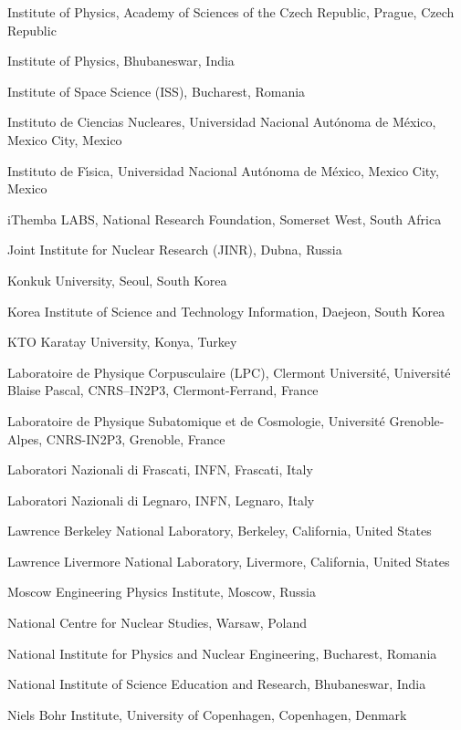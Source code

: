 \begin{flushleft}
\begin{Authlist}
\item {}Institute of Physics, Academy of Sciences of the Czech Republic, Prague, Czech Republic
\item {}Institute of Physics, Bhubaneswar, India
\item {}Institute of Space Science (ISS), Bucharest, Romania
\item {}Instituto de Ciencias Nucleares, Universidad Nacional Aut\'{o}noma de M\'{e}xico, Mexico City, Mexico
\item {}Instituto de F\'{\i}sica, Universidad Nacional Aut\'{o}noma de M\'{e}xico, Mexico City, Mexico
\item {}iThemba LABS, National Research Foundation, Somerset West, South Africa
\item {}Joint Institute for Nuclear Research (JINR), Dubna, Russia
\item {}Konkuk University, Seoul, South Korea
\item {}Korea Institute of Science and Technology Information, Daejeon, South Korea
\item {}KTO Karatay University, Konya, Turkey
\item {}Laboratoire de Physique Corpusculaire (LPC), Clermont Universit\'{e}, Universit\'{e} Blaise Pascal, CNRS--IN2P3, Clermont-Ferrand, France
\item {}Laboratoire de Physique Subatomique et de Cosmologie, Universit\'{e} Grenoble-Alpes, CNRS-IN2P3, Grenoble, France
\item {}Laboratori Nazionali di Frascati, INFN, Frascati, Italy
\item {}Laboratori Nazionali di Legnaro, INFN, Legnaro, Italy
\item {}Lawrence Berkeley National Laboratory, Berkeley, California, United States
\item {}Lawrence Livermore National Laboratory, Livermore, California, United States
\item {}Moscow Engineering Physics Institute, Moscow, Russia
\item {}National Centre for Nuclear Studies, Warsaw, Poland
\item {}National Institute for Physics and Nuclear Engineering, Bucharest, Romania
\item {}National Institute of Science Education and Research, Bhubaneswar, India
\item {}Niels Bohr Institute, University of Copenhagen, Copenhagen, Denmark

\end{Authlist}
\end{flushleft}
